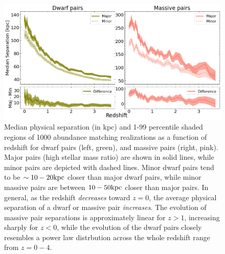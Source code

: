 \documentclass[twocolumn]{aastex631}
\begin{document}
\begin{figure}[htb]
  \centering
  \includegraphics[width=\textwidth]{separation.png}
  \caption{Median physical separation (in kpc) and 1-99 percentile shaded regions of 1000 abundance matching realizations as a function of redshift for dwarf pairs (left, green), and massive pairs (right, pink). Major pairs (high stellar mass ratio) are shown in solid lines, while minor pairs are depicted with dashed lines. Minor dwarf pairs tend to be $\sim10-20\mathrm{kpc}$ closer than major dwarf pairs, while minor massive pairs are between $10-50\mathrm{kpc}$ closer than major pairs. In general, as the redshift \textit{decreases} toward $z=0$, the average physical separation of a dwarf or massive pair \textit{increases}. The evolution of massive pair separations is approximately linear for $z>1$, increasing sharply for $z<0$, while the evolution of the dwarf pairs closely resembles a power law distrbution across the whole redshift range from $z=0-4$. 
    }
  \label{fig:sep}
\end{figure}
\end{document}
